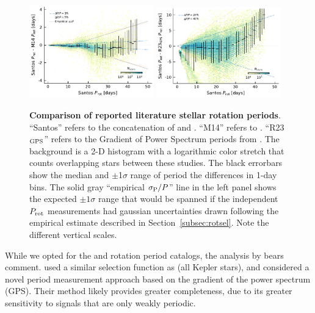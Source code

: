 \documentclass[11pt,twocolumn,tighten]{aastex63}
\begin{document}
\begin{figure}[!b]
  \begin{center}
    \leavevmode
      \includegraphics[width=0.48\textwidth]{perioddiff_vs_period_diffProt-m14_Prot_vs_Prot.pdf}
      \includegraphics[width=0.48\textwidth]{perioddiff_vs_period_diffProt-r23_ProtGPS_vs_Prot.pdf}
  \end{center}
  \vspace{-0.6cm}
  \caption{
    {\bf Comparison of reported literature stellar rotation periods}.
    ``Santos'' refers to the concatenation of \citet{Santos_2019} and
    \citet{Santos_2021}.  ``M14'' refers to \citet{McQuillan_2014}.
    ``R23$_{\rm GPS}$'' refers to the Gradient of Power Spectrum
    periods from \citet{Reinhold2023}.  The background is a 2-D
    histogram with a logarithmic color stretch that counts overlapping
    stars between these studies.  The black errorbars show the median
    and $\pm$1$\sigma$ range of period the differences in 1-day bins.
    The
    solid gray ``empirical $\sigma_{\rm P}/P$'' line in the left panel
    shows the expected $\pm 1\sigma$ range that would be spanned if
    the independent $P_{\rm rot}$ measurements had gaussian
    uncertainties drawn following the empirical estimate described in
    Section~\ref{subsec:rotsel}.
    Note the different vertical scales.
    \label{fig:perioddiff}
  }
\end{figure}

While we opted for the  and
 rotation period catalogs, the analysis 
by \citet{Reinhold2023} bears comment.  \citet{Reinhold2023}
used a similar selection function as \citeauthor{Santos_2021}
(all Kepler stars), and considered a novel period measurement
approach based on the gradient of the power spectrum (GPS).  Their method
likely provides greater completeness, due to its greater sensitivity
to signals that are only weakly periodic.  
\end{document}
